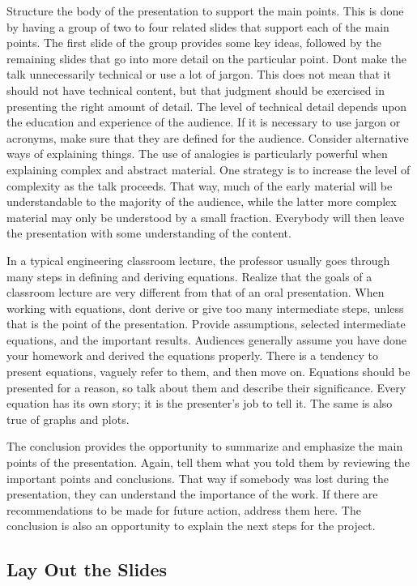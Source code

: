 Structure the body of the presentation to support the main points. This
is done by having a group of two to four related slides that support
each of the main points. The first slide of the group provides some key
ideas, followed by the remaining slides that go into more detail on the
particular point. Don\textquotesingle t make the talk unnecessarily
technical or use a lot of jargon. This does not mean that it should not
have technical content, but that judgment should be exercised in
presenting the right amount of detail. The level of technical detail
depends upon the education and experience of the audience. If it is
necessary to use jargon or acronyms, make sure that they are defined for
the audience. Consider alternative ways of explaining things. The use of
analogies is particularly powerful when explaining complex and abstract
material. One strategy is to increase the level of complexity as the
talk proceeds. That way, much of the early material will be
understandable to the majority of the audience, while the latter more
complex material may only be understood by a small fraction. Everybody
will then leave the presentation with some understanding of the content.

In a typical engineering classroom lecture, the professor usually goes
through many steps in defining and deriving equations. Realize that the
goals of a classroom lecture are very different from that of an oral
presentation. When working with equations, don\textquotesingle t derive
or give too many intermediate steps, unless that is the point of the
presentation. Provide assumptions, selected intermediate equations, and
the important results. Audiences generally assume you have done your
homework and derived the equations properly. There is a tendency to
present equations, vaguely refer to them, and then move on. Equations
should be presented for a reason, so talk about them and describe their
significance. Every equation has its own story; it is the presenter's
job to tell it. The same is also true of graphs and plots.

The conclusion provides the opportunity to summarize and emphasize the
main points of the presentation. Again, tell them what you told them by
reviewing the important points and conclusions. That way if somebody was
lost during the presentation, they can understand the importance of the
work. If there are recommendations to be made for future action, address
them here. The conclusion is also an opportunity to explain the next
steps for the project.

\subsection*{Lay Out the Slides}
\label{subsection:lay-out-the-slides}

